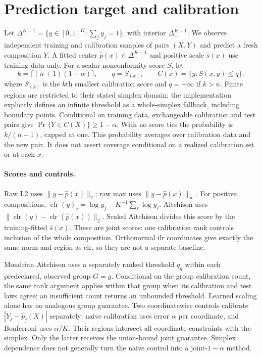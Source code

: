 \section{Prediction target and calibration}
\label{sec:methods}
Let $\Delta^{K-1}=\{y\in[0,1]^K:\sum_j y_j=1\}$, with interior $\Delta^{K-1}_+$. We observe independent training and calibration samples of pairs $(X,Y)$ and predict a fresh composition $Y$. A fitted center $\hat p(x)\in\Delta^{K-1}_+$ and positive scale $\hat s(x)$ use training data only. For a scalar nonconformity score $S$, let
\begin{equation}
 k=\lceil(n+1)(1-\alpha)\rceil,\qquad
 q=S_{(k)},\qquad C(x)=\{y:S(x,y)\le q\},
 \label{eq:rank}
\end{equation}
where $S_{(k)}$ is the $k$th smallest calibration score and $q=+\infty$ if $k>n$. Finite regions are restricted to their stated simplex domain; the implementation explicitly defines an infinite threshold as a whole-simplex fallback, including boundary points. Conditional on training data, exchangeable calibration and test pairs give $\Pr\{Y\in C(X)\}\ge1-\alpha$. With no score ties the probability is $k/(n+1)$, capped at one. This probability averages over calibration data and the new pair. It does not assert coverage conditional on a realized calibration set or at each $x$.

\paragraph{Scores and controls.}
Raw L2 uses $\|y-\hat p(x)\|_2$; raw max uses $\|y-\hat p(x)\|_\infty$. For positive compositions, $\operatorname{clr}(y)_j=\log y_j-K^{-1}\sum_\ell\log y_\ell$. Aitchison uses $\|\operatorname{clr}(y)-\operatorname{clr}(\hat p(x))\|_2$. Scaled Aitchison divides this score by the training-fitted $\hat s(x)$. These are joint scores: one calibration rank controls inclusion of the whole composition. Orthonormal ilr coordinates give exactly the same norm and region as clr, so they are not a separate baseline.

Mondrian Aitchison uses a separately ranked threshold $q_g$ within each predeclared, observed group $G=g$. Conditional on the group calibration count, the same rank argument applies within that group when its calibration and test laws agree; an insufficient count returns an unbounded threshold. Learned scaling alone has no analogous group guarantee. Two coordinatewise controls calibrate $|Y_j-\hat p_j(X)|$ separately: naive calibration uses error $\alpha$ per coordinate, and Bonferroni uses $\alpha/K$. Their regions intersect all coordinate constraints with the simplex. Only the latter receives the union-bound joint guarantee. Simplex dependence does not generally turn the naive control into a joint-$1-\alpha$ method.

